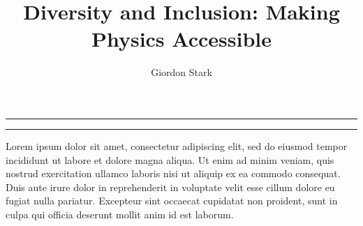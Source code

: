 \documentclass{article}
\title{Diversity and Inclusion: Making Physics Accessible}
\author[a]{Giordon Stark}
\affil[a]{SCIPP, UC Santa Cruz}
\date{}
\begin{document}
  \maketitle
  \hrule
  \vspace{0.5em}
  \hrule
  \vspace{2.5em}
  Lorem ipsum dolor sit amet, consectetur adipiscing elit, sed do eiusmod tempor incididunt ut labore et dolore magna aliqua. Ut enim ad minim veniam, quis nostrud exercitation ullamco laboris nisi ut aliquip ex ea commodo consequat. Duis aute irure dolor in reprehenderit in voluptate velit esse cillum dolore eu fugiat nulla pariatur. Excepteur sint occaecat cupidatat non proident, sunt in culpa qui officia deserunt mollit anim id est laborum.
\end{document}
